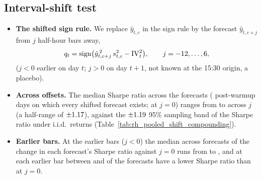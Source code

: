 \subsection{Interval-shift test}
\label{app:rh_econ_shift}
\begin{itemize}
\item \textbf{The shifted sign rule.} We replace $\hat y_{t,c}$ in the sign rule by the forecast $\hat y_{t,c+j}$ from
  $j$ half-hour bars away,
  \[
    q_t = \operatorname{sign}\bigl(\hat y_{t,c+j}^{\,2}\, s^2_{t,c} - \mathrm{IV}_t^2\bigr), \qquad j = -12, \dots, 6,
  \]
  ($j < 0$ earlier on day $t$; $j > 0$ on day $t+1$, not known at the 15:30 origin, a placebo).
\item \textbf{Across offsets.} The median Sharpe ratio across the \rhpsNfc{} forecasts (\rhpsNdays{}
  post-warmup days on which every shifted forecast exists; \rhpsZeroMed{} at $j = 0$) ranges from \rhpsMedLo{} to
  \rhpsMedHi{} across $j$ (a half-range of $\pm1.17$), against the $\pm1.19$ 95\% sampling band of the
  Sharpe ratio under i.i.d.\ returns (Table~\ref{tab:rh_pooled_shift_compounding}).
\item \textbf{Earlier bars.} At the earlier bars ($j < 0$) the median across forecasts of the change in each
  forecast's Sharpe ratio against $j = 0$ runs from \rhpsSameDeltaLo{} to \rhpsSameDeltaHi, and at each earlier bar
  between \rhpsStaleNBelowMin{} and \rhpsStaleNBelowMax{} of the \rhpsNfc{} forecasts have a lower Sharpe ratio than
  at $j = 0$.
\end{itemize}
